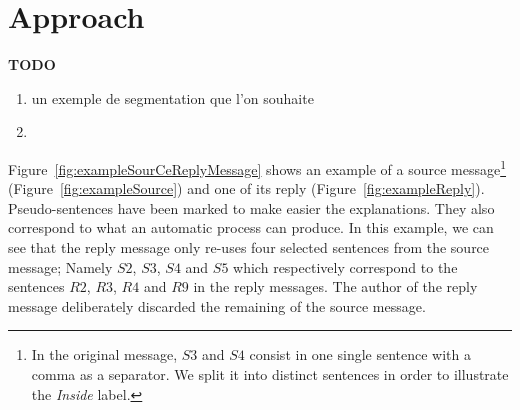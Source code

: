 
\section{Approach}
\label{}

\textbf{TODO}
\begin{enumerate}
\item un exemple de segmentation que l'on souhaite
\item 
\end{enumerate}


Figure~\ref{fig:exampleSourCeReplyMessage} shows an example of a source message\footnote{In the original message, $S3$ and $S4$ consist in one single sentence with a comma as a separator. We split it into distinct sentences in order to illustrate the \textit{Inside} label.} (Figure~\ref{fig:exampleSource}) and one of its reply (Figure~\ref{fig:exampleReply}).
Pseudo-sentences have been marked to make easier the explanations. 
They also correspond to what an automatic process can produce.
In this example, we can see that the reply message only re-uses four selected sentences from the source message; Namely $S2$, $S3$, $S4$ and $S5$ which respectively correspond to the sentences  $R2$, $R3$, $R4$ and $R9$ in the reply messages.
The author of the reply message deliberately discarded the remaining of the source message.

